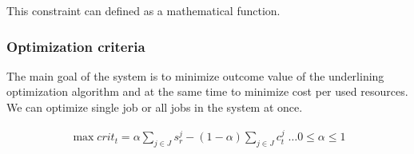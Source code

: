 This constraint can defined as a mathematical function.

\subsubsection{Optimization criteria}
The main goal of the system is to minimize outcome value of the underlining optimization algorithm
and at the same time to minimize cost per used resources.
We can optimize single job or all jobs in the system at once.



\begin{align*}
    \max crit_{t} = \alpha \sum_{j \in J} s_{r}^{j} - (1 - \alpha) \sum_{j \in J} c_{t}^{j} \; \ldots 0 \leq \alpha \leq 1
\end{align*}